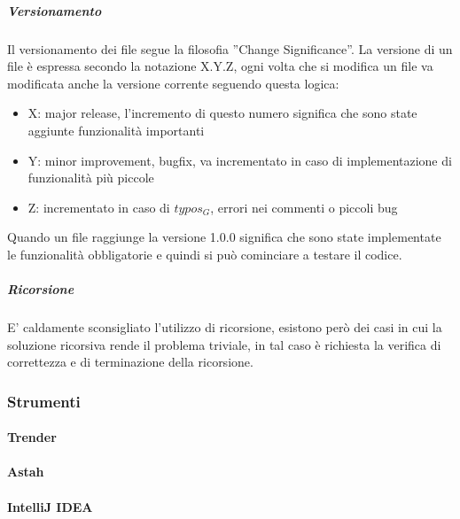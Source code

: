 			\subparagraph{Versionamento}
			Il versionamento dei file segue la filosofia ''Change Significance''. La versione di un file è espressa secondo la notazione X.Y.Z, ogni volta che si modifica un file va modificata anche la versione corrente seguendo questa logica:			
			\begin{itemize}
				\item X: major release, l'incremento di questo numero significa che sono state aggiunte funzionalità importanti
				\item Y: minor improvement, bugfix, va incrementato in caso di implementazione di funzionalità più piccole
				\item Z: incrementato in caso di $typos_G$, errori nei commenti o piccoli bug
			\end{itemize}
			Quando un file raggiunge la versione 1.0.0 significa che sono state implementate le funzionalità obbligatorie e quindi si può cominciare a testare il codice.

			\subparagraph{Ricorsione}
			E' caldamente sconsigliato l'utilizzo di ricorsione, esistono però dei casi in cui la soluzione ricorsiva rende il problema triviale, in tal caso è richiesta la verifica di correttezza e di terminazione della ricorsione.
	\subsubsection{Strumenti}
		\paragraph{Trender}
		\paragraph{Astah}
		\paragraph{IntelliJ IDEA}
			
			
